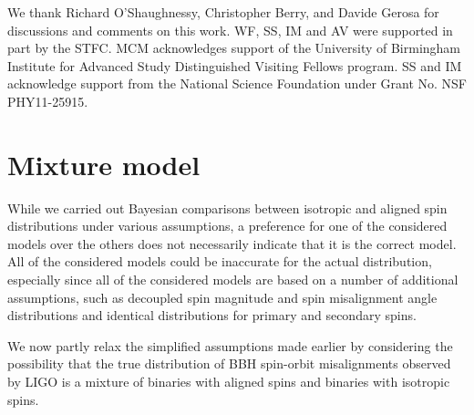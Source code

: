 \documentclass[modern,linenumbers]{aastex61}
\begin{document}
\acknowledgements

We thank Richard O'Shaughnessy, Christopher Berry, and Davide Gerosa
for discussions and comments on this work.  WF, SS, IM and AV were
supported in part by the STFC.  MCM acknowledges support of the
University of Birmingham Institute for Advanced Study Distinguished
Visiting Fellows program.  SS and IM acknowledge support from the
National Science Foundation under Grant No. NSF PHY11-25915.

\appendix

\section{Mixture model}

While we carried out Bayesian comparisons between isotropic and aligned spin distributions under various assumptions, a preference for one of the considered models over the others does not necessarily indicate that it is the correct model.  All of the considered models could be inaccurate for the actual distribution, especially since all of the considered models are based on a number of additional assumptions, such as decoupled spin magnitude and spin misalignment angle distributions and identical distributions for primary and secondary spins.

We now partly relax the simplified assumptions made earlier by considering the possibility that the true distribution of BBH spin-orbit misalignments observed by LIGO is a mixture of binaries with aligned spins and binaries with isotropic spins.
\end{document}
